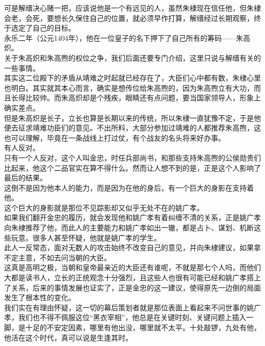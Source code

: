 \begin{multicols}{\theparacolNo}
可是解缙决心赌一把，应该说他是一个有远见的人，虽然朱棣现在信任他，但朱棣会老，会死，要想长久保住自己的位置，就必须早作打算，解缙经过长期观察，终于选定了自己的目标。\\

永乐二年（公元1404年），他在一位皇子的名下押下了自己所有的筹码——朱高炽。\\

关于朱高炽和朱高煦的权位之争，我们后面还要专门介绍，这里只说与解缙有关的一些事情。\\

其实这二位殿下的矛盾从靖难之时起就已经存在了，大臣们心中都有数，朱棣心里也明白。其实就其本心而言，确实是想传位给朱高煦的，因为朱高煦立有大功，而且长得比较帅。而朱高炽却是个残疾，眼睛还有点问题，要当国家领导人，形象上确实差点。\\

但是朱高炽是长子，立长也算是长期以来的传统，所以朱棣一直犹豫不定，于是他便去征求靖难功臣们的意见。不出所料，大部分参加过靖难的人都推荐朱高煦，这也可以理解，毕竟在一条战线上打过仗，有个战友的名头将来好办事。\\

有人反对。\\

只有一个人反对，这个人叫金忠，时任兵部尚书，和那些支持朱高煦的公侯勋贵们比起来，他这个二品官实在算不得什么。然而让人想不到的是，正是这个人影响了最后的结果。\\

这倒不是因为他本人的能力，而是因为在他的身后，有一个巨大的身影在支持着他。\\

这个巨大的身影就是那位不见踪影却又似乎无处不在的姚广孝。\\

如果我们翻开金忠的履历，就会发现他和姚广孝有着纠缠不清的关系，正是姚广孝向朱棣推荐了他，而此人的主要能力和姚广孝如出一辙，都是占卜、谋划、机断这些玩意。很多人甚至怀疑，他就是姚广孝的学生。\\

此人一反常态，面对无数人的攻击始终不改变自己的意见，并向朱棣建议，如果拿不定主意，不如去问当朝的大臣。\\

这真是高明之极，当朝和皇帝最亲近的大臣还有谁呢，不就是那七个人吗，而他们大都是读书人，立长的正统观念十分强烈，且这些人也很有可能已经和姚广孝搭上了关系，后来的事情发展也证实了，正是金忠的这一建议，使得原先一边倒的局面发生了根本性的变化。\\

我们实在有理由怀疑，这一切的幕后策划者就是那位表面上看起来不问世事的姚广孝，我们也不得不佩服这位“黑衣宰相”，他总是在关键时刻、关键问题上插入一脚，是十足的不安定因素，哪里有他出没，哪里就不太平。十处敲锣，九处有他，他活在这个时代，真可以说是生逢其时。\\


\end{multicols}
